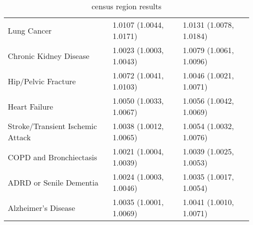 \begin{table}[ht]
\begin{tabular}{lll}
  Lung Cancer & 1.0107 (1.0044, 1.0171) & 1.0131 (1.0078, 1.0184) \\ 
  Chronic Kidney Disease & 1.0023 (1.0003, 1.0043) & 1.0079 (1.0061, 1.0096) \\ 
  Hip/Pelvic Fracture & 1.0072 (1.0041, 1.0103) & 1.0046 (1.0021, 1.0071) \\ 
  Heart Failure & 1.0050 (1.0033, 1.0067) & 1.0056 (1.0042, 1.0069) \\ 
  Stroke/Transient Ischemic Attack & 1.0038 (1.0012, 1.0065) & 1.0054 (1.0032, 1.0076) \\ 
  COPD and Bronchiectasis & 1.0021 (1.0004, 1.0039) & 1.0039 (1.0025, 1.0053) \\ 
  ADRD or Senile Dementia & 1.0024 (1.0003, 1.0046) & 1.0035 (1.0017, 1.0054) \\ 
  Alzheimer's Disease & 1.0035 (1.0001, 1.0069) & 1.0041 (1.0010, 1.0071) \\ 
   \hline
\end{tabular}
\caption{census region results} 
\label{tab:stratified_OR_NE_MW}
\end{table}

